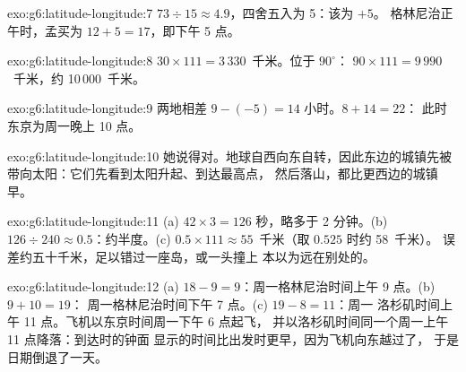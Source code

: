 \begin{solution}{exo:g6:latitude-longitude:7}
$73 \div 15 \approx 4.9$，四舍五入为 5：该为 $+5$。
格林尼治正午时，孟买为 $12 + 5 = 17$，即下午 5 点。
\end{solution}

\begin{solution}{exo:g6:latitude-longitude:8}
$30 \times 111 = 3\,330$~千米。位于 $90^\circ$：
$90 \times 111 = 9\,990$~千米，约 10\,000~千米。
\end{solution}

\begin{solution}{exo:g6:latitude-longitude:9}
两地相差 $9 - (-5) = 14$ 小时。$8 + 14 = 22$：
此时东京为周一晚上 10 点。
\end{solution}

\begin{solution}{exo:g6:latitude-longitude:10}
她说得对。地球自西向东自转，因此东边的城镇先被
带向太阳：它们先看到太阳升起、到达最高点，
然后落山，都比更西边的城镇早。
\end{solution}

\begin{solution}{exo:g6:latitude-longitude:11}
(a) $42 \times 3 = 126$ 秒，略多于 2 分钟。(b)
$126 \div 240 \approx 0.5$：约半度。(c)
$0.5 \times 111 \approx 55$~千米（取 $0.525$ 时约 58~千米）。
误差约五十千米，足以错过一座岛，或一头撞上
本以为远在别处的。
\end{solution}

\begin{solution}{exo:g6:latitude-longitude:12}
(a) $18 - 9 = 9$：周一格林尼治时间上午 9 点。(b) $9 + 10 = 19$：
周一格林尼治时间下午 7 点。(c) $19 - 8 = 11$：周一
洛杉矶时间上午 11 点。飞机以东京时间周一下午 6 点起飞，
并以洛杉矶时间同一个周一上午 11 点降落：到达时的钟面
显示的时间比出发时更早，因为飞机向东越过了，
于是日期倒退了一天。
\end{solution}

